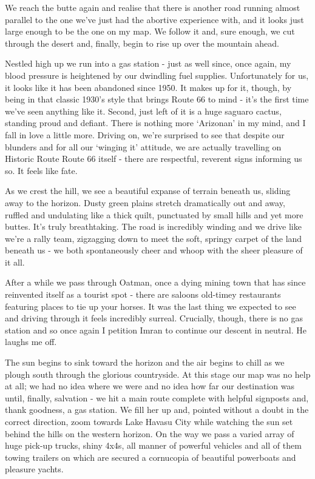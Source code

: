 \documentclass[a5paper,titlepage,draft]{book}
\begin{document}
We reach the butte again and realise that there is another road running almost parallel to the one we've just had the abortive experience with, and it looks just large enough to be the one on my map.  We follow it and, sure enough, we cut through the desert and, finally, begin to rise up over the mountain ahead.

Nestled high up we run into a gas station - just as well since, once again, my blood pressure is heightened by our dwindling fuel supplies.  Unfortunately for us, it looks like it has been abandoned since 1950.  It makes up for it, though, by being in that classic 1930's style that brings Route 66 to mind - it's the first time we've seen anything like it.  Second, just left of it is a huge saguaro cactus, standing proud and defiant.  There is nothing more `Arizonan' in my mind, and I fall in love a little more.  Driving on, we're surprised to see that despite our blunders and for all our `winging it' attitude, we are actually travelling on Historic Route Route 66 itself - there are respectful, reverent signs informing us so.  It feels like fate.

As we crest the hill, we see a beautiful expanse of terrain beneath us, sliding away to the horizon.  Dusty green plains stretch dramatically out and away, ruffled and undulating like a thick quilt, punctuated by small hills and yet more buttes.  It's truly breathtaking.  The road is incredibly winding and we drive like we're a rally team, zigzagging down to meet the soft, springy carpet of the land beneath us - we both spontaneously cheer and whoop with the sheer pleasure of it all.

After a while we pass through Oatman, once a dying mining town that has since reinvented itself as a tourist spot - there are saloons old-timey restaurants featuring places to tie up your horses.  It was the last thing we expected to see and driving through it feels incredibly surreal.  Crucially, though, there is no gas station and so once again I petition Imran to continue our descent in neutral.  He laughs me off.

The sun begins to sink toward the horizon and the air begins to chill as we plough south through the glorious countryside.  At this stage our map was no help at all; we had no idea where we were and no idea how far our destination was until, finally, salvation - we hit a main route complete with helpful signposts and, thank goodness, a gas station.  We fill her up and, pointed without a doubt in the correct direction, zoom towards Lake Havasu City while watching the sun set behind the hills on the western horizon.  On the way we pass a varied array of huge pick-up trucks, shiny 4x4s, all manner of powerful vehicles and all of them towing trailers on which are secured a cornucopia of beautiful powerboats and pleasure yachts.
\end{document}
